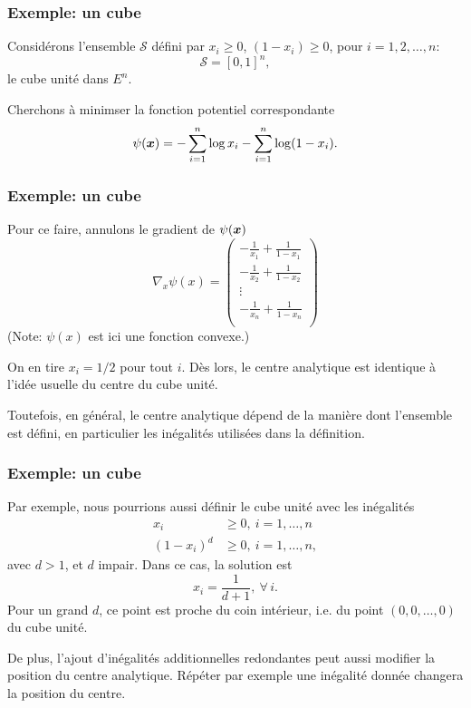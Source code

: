 \documentclass[usepdftitle=false, aspectratio=169]{beamer}
\begin{document}
\begin{frame}
\frametitle{Exemple: un cube}

Considérons l'ensemble $\mathcal{S}$ défini par $x_i \geq 0$, $(1-x_i) \geq 0$, pour $i = 1,2,\ldots,n$:
\[
\mathcal{S} = [0,1]^n,
\]
le cube unité dans $E^n$.

\mbox{}

Cherchons à minimser la fonction potentiel correspondante
\[
\psi({\boldsymbol{x}}) = -\sum_{i = 1}^n \log x_i - \sum_{i = 1}^n \log (1-x_i).
\]

\end{frame}

\begin{frame}
\frametitle{Exemple: un cube}

Pour ce faire, annulons le gradient de $\psi({\boldsymbol{x}})$
\[
\nabla_x \psi(x) =
\begin{pmatrix}
- \frac{1}{x_1} + \frac{1}{1-x_1} \\
- \frac{1}{x_2} + \frac{1}{1-x_2} \\
\vdots \\
- \frac{1}{x_n} + \frac{1}{1-x_n} \\
\end{pmatrix}
\]
(Note: $\psi(x)$ est ici une fonction convexe.)

\mbox{}

On en tire $x_i = 1/2$ pour tout $i$.
Dès lors, le centre analytique est identique à l'idée usuelle du centre du cube unité.

\mbox{}

Toutefois, en général, le centre analytique dépend de la manière dont l'ensemble est défini, en particulier les inégalités utilisées dans la définition.

\end{frame}

\begin{frame}
\frametitle{Exemple: un cube}

Par exemple, nous pourrions aussi définir le cube unité avec les inégalités
\begin{align*}
x_i &\geq 0, \ i = 1,\ldots,n\\
(1-x_i)^d &\geq 0,\ i = 1,\ldots,n,
\end{align*}
avec $d > 1$, et $d$ impair.
Dans ce cas, la solution est
\[
x_i = \frac{1}{d+1},\ \forall\, i.
\]
Pour un grand $d$, ce point est proche du coin intérieur, i.e. du point $(0,0,\ldots,0)$ du cube unité.

\mbox{}

De plus, l'ajout d'inégalités additionnelles redondantes peut aussi modifier la position du centre analytique. Répéter par exemple une inégalité donnée changera la position du centre.

\end{frame}
\end{document}
